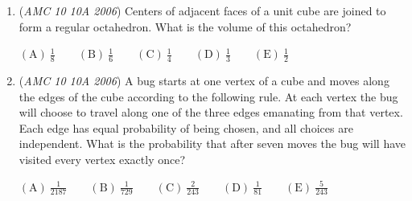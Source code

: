 \begin{enumerate}
	\item (\textit{AMC 10 10A 2006}) Centers of adjacent faces of a unit cube are joined to form a regular octahedron. What is the volume of this octahedron? 


 $\mathrm{(A)}\ \frac{1}{8}\qquad\mathrm{(B)}\ \frac{1}{6}\qquad\mathrm{(C)}\ \frac{1}{4}\qquad\mathrm{(D)}\ \frac{1}{3}\qquad\mathrm{(E)}\ \frac{1}{2}$


	\item (\textit{AMC 10 10A 2006}) A bug starts at one vertex of a cube and moves along the edges of the cube according to the following rule. At each vertex the bug will choose to travel along one of the three edges emanating from that vertex. Each edge has equal probability of being chosen, and all choices are independent. What is the probability that after seven moves the bug will have visited every vertex exactly once? 


 $\mathrm{(A)}\ \frac{1}{2187}\qquad\mathrm{(B)}\ \frac{1}{729}\qquad\mathrm{(C)}\ \frac{2}{243}\qquad\mathrm{(D)}\ \frac{1}{81}\qquad\mathrm{(E)}\ \frac{5}{243}$


\end{enumerate}
